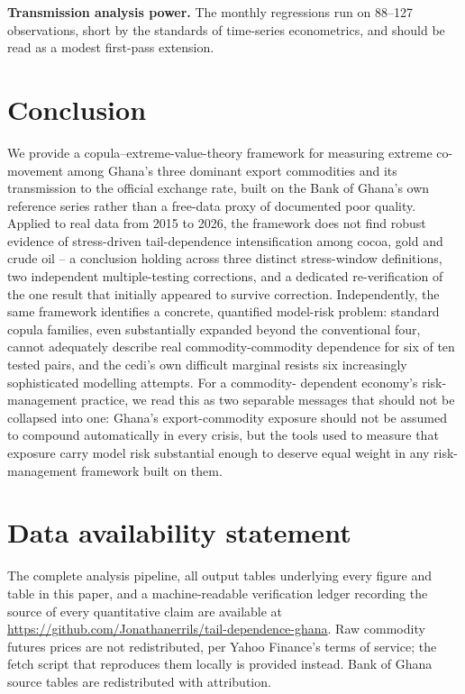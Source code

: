 \documentclass[final,3p,times,authoryear]{elsarticle}
\begin{document}
\textbf{Transmission analysis power.} The monthly regressions run on
88--127 observations, short by the standards of time-series
econometrics, and should be read as a modest first-pass extension.

\section{Conclusion}
\label{sec:conclusion}

We provide a copula--extreme-value-theory framework for measuring
extreme co-movement among Ghana's three dominant export commodities and
its transmission to the official exchange rate, built on the Bank of
Ghana's own reference series rather than a free-data proxy of documented
poor quality. Applied to real data from 2015 to 2026, the framework does
not find robust evidence of stress-driven tail-dependence intensification
among cocoa, gold and crude oil -- a conclusion holding across three
distinct stress-window definitions, two independent multiple-testing
corrections, and a dedicated re-verification of the one result that
initially appeared to survive correction. Independently, the same
framework identifies a concrete, quantified model-risk problem: standard
copula families, even substantially expanded beyond the conventional
four, cannot adequately describe real commodity-commodity dependence for
six of ten tested pairs, and the cedi's own difficult marginal resists
six increasingly sophisticated modelling attempts. For a commodity-
dependent economy's risk-management practice, we read this as two
separable messages that should not be collapsed into one: Ghana's
export-commodity exposure should not be assumed to compound
automatically in every crisis, but the tools used to measure that
exposure carry model risk substantial enough to deserve equal weight in
any risk-management framework built on them.

\section*{Data availability statement}
The complete analysis pipeline, all output tables underlying every
figure and table in this paper, and a machine-readable verification
ledger recording the source of every quantitative claim are available at
\url{https://github.com/Jonathanerrils/tail-dependence-ghana}. Raw
commodity futures prices are not redistributed, per Yahoo Finance's
terms of service; the fetch script that reproduces them locally is
provided instead. Bank of Ghana source tables are redistributed with
attribution.
\end{document}
